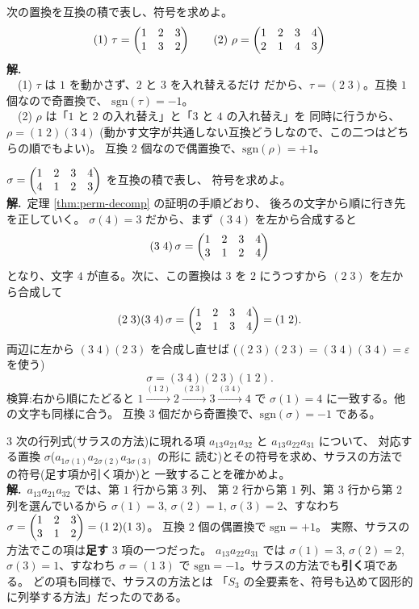 \begin{rei}[例題・基本(互換への分解と符号)]\label{rei:perm-sgn-ex}
次の置換を互換の積で表し、符号を求めよ。
\[
(1)\ \tau = \begin{pmatrix}1 & 2 & 3 \\ 1 & 3 & 2\end{pmatrix} \qquad
(2)\ \rho = \begin{pmatrix}1 & 2 & 3 & 4 \\ 2 & 1 & 4 & 3\end{pmatrix}
\]
\textbf{解.}\\
　(1) $\tau$ は $1$ を動かさず、$2$ と $3$ を入れ替えるだけ
だから、$\tau = (2\;3)$。互換 $1$ 個なので奇置換で、
$\mathrm{sgn}(\tau) = -1$。\\
　(2) $\rho$ は「$1$ と $2$ の入れ替え」と「$3$ と $4$ の入れ替え」を
同時に行うから、$\rho = (1\;2)(3\;4)$
(動かす文字が共通しない互換どうしなので、この二つはどちらの順でもよい)。
互換 $2$ 個なので偶置換で、$\mathrm{sgn}(\rho) = +1$。
\end{rei}

\begin{rei}[例題・標準($4$ 文字の置換の符号)]\label{rei:perm-sort}
$\sigma = \begin{pmatrix}1 & 2 & 3 & 4 \\ 4 & 1 & 2 & 3\end{pmatrix}$ を互換の積で表し、
符号を求めよ。\\
\textbf{解.}\ 定理 \ref{thm:perm-decomp} の証明の手順どおり、
後ろの文字から順に行き先を正していく。
$\sigma(4) = 3$ だから、まず $(3\;4)$ を左から合成すると
\[
(3\;4)\,\sigma = \begin{pmatrix}1 & 2 & 3 & 4 \\ 3 & 1 & 2 & 4\end{pmatrix}
\]
となり、文字 $4$ が直る。次に、この置換は $3$ を $2$ にうつすから
$(2\;3)$ を左から合成して
\[
(2\;3)(3\;4)\,\sigma = \begin{pmatrix}1 & 2 & 3 & 4 \\ 2 & 1 & 3 & 4\end{pmatrix} = (1\;2).
\]
両辺に左から $(3\;4)(2\;3)$ を合成し直せば
($(2\;3)(2\;3) = (3\;4)(3\;4) = \varepsilon$ を使う)
\[
\sigma = (3\;4)(2\;3)(1\;2).
\]
検算:右から順にたどると
$1 \xrightarrow{(1\;2)} 2 \xrightarrow{(2\;3)} 3 \xrightarrow{(3\;4)} 4$ で
$\sigma(1) = 4$ に一致する。他の文字も同様に合う。
互換 $3$ 個だから奇置換で、$\mathrm{sgn}(\sigma) = -1$ である。
\end{rei}

\begin{rei}[例題・標準(サラスの項と置換の対応)]\label{rei:perm-sarrus}
$3$ 次の行列式(サラスの方法)に現れる項
$a_{13}a_{21}a_{32}$ と $a_{13}a_{22}a_{31}$ について、
対応する置換 $\sigma$($a_{1\sigma(1)}a_{2\sigma(2)}a_{3\sigma(3)}$ の形に
読む)とその符号を求め、サラスの方法での符号(足す項か引く項か)と
一致することを確かめよ。\\
\textbf{解.}\ $a_{13}a_{21}a_{32}$ では、第 $1$ 行から第 $3$ 列、
第 $2$ 行から第 $1$ 列、第 $3$ 行から第 $2$ 列を選んでいるから
$\sigma(1) = 3$, $\sigma(2) = 1$, $\sigma(3) = 2$、すなわち
$\sigma = \begin{pmatrix}1 & 2 & 3 \\ 3 & 1 & 2\end{pmatrix} = (1\;2)(1\;3)$。
互換 $2$ 個の偶置換で $\mathrm{sgn} = +1$。
実際、サラスの方法でこの項は\textbf{足す} $3$ 項の一つだった。
$a_{13}a_{22}a_{31}$ では $\sigma(1) = 3$, $\sigma(2) = 2$,
$\sigma(3) = 1$、すなわち $\sigma = (1\;3)$ で
$\mathrm{sgn} = -1$。サラスの方法でも\textbf{引く}項である。
どの項も同様で、サラスの方法とは
「$S_3$ の全要素を、符号も込めて図形的に列挙する方法」だったのである。
\end{rei}

